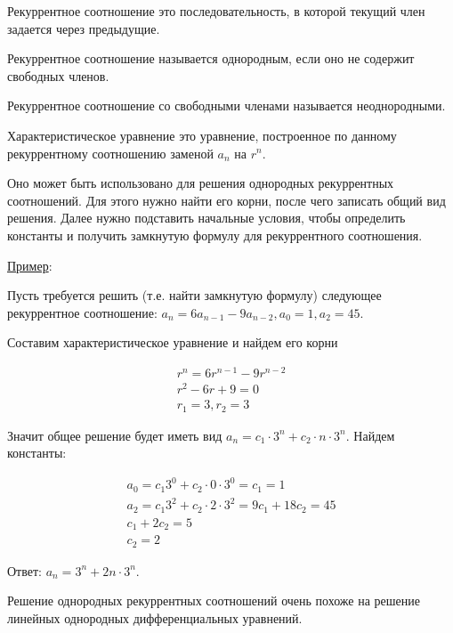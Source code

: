 
\begin{definition}
  Рекуррентное соотношение это последовательность, в которой текущий член
  задается через предыдущие.
\end{definition}

\begin{definition}
  Рекуррентное соотношение называется однородным, если оно не содержит свободных
  членов.

  Рекуррентное соотношение со свободными членами называется неоднородными.
\end{definition}

\begin{definition}
  Характеристическое уравнение это уравнение, построенное по данному
  рекуррентному соотношению заменой \(a_{n}\) на \(r^{n}\).
\end{definition}

Оно может быть использовано для решения однородных рекуррентных соотношений. Для
этого нужно найти его корни, после чего записать общий вид решения. Далее нужно
подставить начальные условия, чтобы определить константы и получить замкнутую
формулу для рекуррентного соотношения.

\underline{Пример}:

Пусть требуется решить (т.е. найти замкнутую формулу) следующее рекуррентное
соотношение: \(a_{n} = 6 a_{n - 1} - 9 a_{n - 2}, a_{0} = 1, a_{2} = 45\).

Составим характеристическое уравнение и найдем его корни

\begin{align*}
  r^{n} = 6 r^{n - 1} - 9 r^{n - 2} \\
  r^{2} - 6 r + 9 = 0 \\
  r_{1} = 3, r_{2} = 3
\end{align*}

Значит общее решение будет иметь вид
\(a_{n} = c_{1} \cdot 3^{n} + c_{2} \cdot n \cdot 3^{n}\).
Найдем константы:

\begin{align*}
  a_{0} = c_{1} 3^{0} + c_{2} \cdot 0 \cdot 3^{0} = c_{1} = 1 \\
  a_{2} = c_{1} 3^{2} + c_{2} \cdot 2 \cdot 3^{2} = 9 c_{1} + 18 c_{2} = 45 \\
  c_{1} + 2 c_{2} = 5 \\
  c_{2} = 2
\end{align*}

Ответ: \(a_{n} = 3^{n} + 2n \cdot 3^{n}\).


\begin{remark}
  Решение однородных рекуррентных соотношений очень похоже на решение линейных
  однородных дифференциальных уравнений.
\end{remark}
